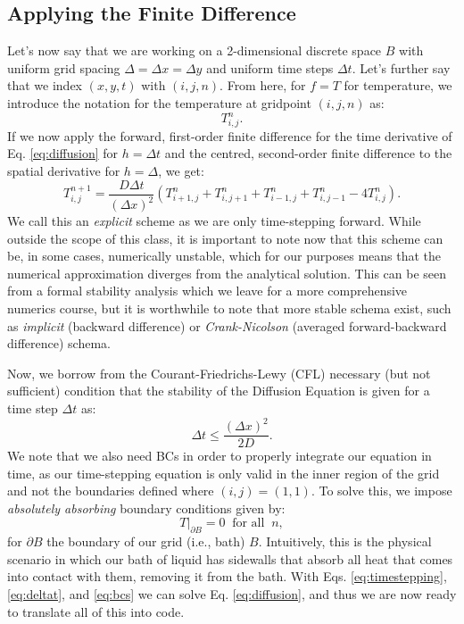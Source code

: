 \documentclass[11pt]{article}
\begin{document}
\subsection*{Applying the Finite Difference}

Let's now say that we are working on a 2-dimensional discrete space $B$ with uniform grid spacing $\Delta = \Delta x = \Delta y$ and uniform time steps $\Delta t$.
Let's further say that we index $\left(x,y,t\right)$ with $\left(i,j, n\right)$.
From here, for $f = T$ for temperature, we introduce the notation for the temperature at gridpoint $\left(i,j,n\right)$ as:
 \begin{equation}
	T_{i,j}^n.
\end{equation}
If we now apply the forward, first-order finite difference for the time derivative of Eq. \eqref{eq:diffusion} for $h = \Delta t$ and the centred, second-order finite difference to the spatial derivative for $h = \Delta$, we get:
\begin{equation}
	T_{i,j}^{n+1} = \frac{D \Delta t}{\left(\Delta x\right)^2} \left(T_{i+1,j}^n + T_{i,j+1}^n + T_{i-1,j}^n + T_{i,j-1}^n - 4T_{i,j}^n\right).
	\label{eq:timestepping}
\end{equation}
We call this an \emph{explicit} scheme as we are only time-stepping forward. 
While outside the scope of this class, it is important to note now that this scheme can be, in some cases, numerically unstable, which for our purposes means that the numerical approximation diverges from the analytical solution. 
This can be seen from a formal stability analysis which we leave for a more comprehensive numerics course, but it is worthwhile to note that more stable schema exist, such as \emph{implicit} (backward difference) or \emph{Crank-Nicolson} (averaged forward-backward difference) schema. \par
Now, we borrow from the Courant-Friedrichs-Lewy (CFL) necessary (but not sufficient) condition that the stability of the Diffusion Equation is given for a time step $\Delta t$ as:
\begin{equation}
	\Delta t \le \frac{\left(\Delta x\right)^2}{2D}.
	\label{eq:deltat}
\end{equation}
We note that we also need BCs in order to properly integrate our equation in time, as our time-stepping equation is only valid in the inner region of the grid and not the boundaries defined where $\left(i,j\right)=\left(1,1\right)$.
To solve this, we impose \emph{absolutely absorbing} boundary conditions given by:
\begin{equation}
	T\big\lvert_{\partial B} = 0 \: \text{ for all } \: n,
	\label{eq:bcs}
\end{equation}
for $\partial B$ the boundary of our grid  (i.e., bath) $B$.
Intuitively, this is the physical scenario in which our bath of liquid has sidewalls that absorb all heat that comes into contact with them, removing it from the bath.
With Eqs. \eqref{eq:timestepping}, \eqref{eq:deltat}, and \eqref{eq:bcs} we can solve Eq. \eqref{eq:diffusion}, and thus we are now ready to translate all of this into code.

\end{document}
